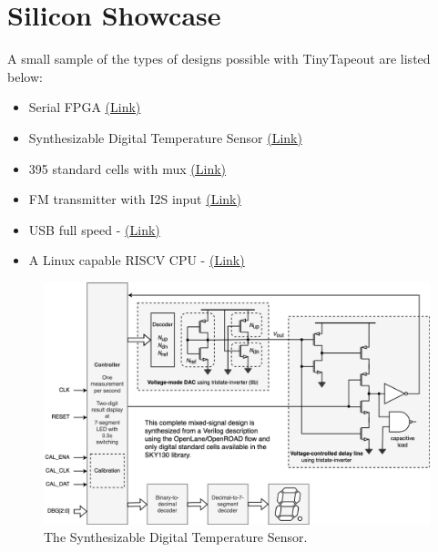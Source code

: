 \section{Silicon Showcase}
\label{sec:silicon_showcasee}

A small sample of the types of designs possible with TinyTapeout are listed below:

\begin{itemize}
    \item Serial FPGA \href{https://tinytapeout.com/runs/tt02/006/}{(Link)}
    \item Synthesizable Digital Temperature Sensor \href{https://tinytapeout.com/runs/tt03/047/}{(Link)}
    \item 395 standard cells with mux \href{https://tinytapeout.com/runs/tt03/045/}{(Link)}
    \item FM transmitter with I2S input \href{https://tinytapeout.com/runs/tt04/195/}{(Link)}
    \item USB full speed - \href{https://tinytapeout.com/runs/tt04/054/}{(Link)}
    \item A Linux capable RISCV CPU - \href{https://tinytapeout.com/runs/tt05/654/}{(Link)}
\end{itemize}

\begin{figure}[htp]
\centering
\includegraphics[width=\columnwidth]{./Figs/synthesized_temperature_sensor.png}
\caption{The Synthesizable Digital Temperature Sensor.}
\label{fig:synthesizable_digital_temperature_sensor}
\end{figure}
